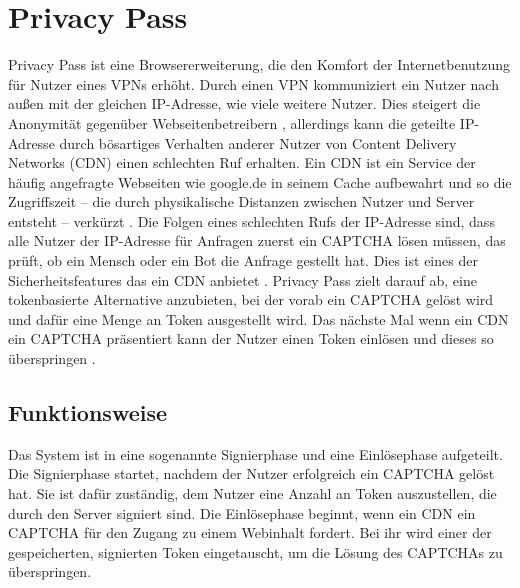 \documentclass[
	fontsize=11pt,
	headings=small,
	parskip=half,           %
	bibliography=totoc,
	numbers=noenddot,       %
	open=any,               %
]{scrreprt}
\begin{document}
\section{Privacy Pass}
\label{sec:privacy-pass}
Privacy Pass ist eine Browsererweiterung, die den Komfort der Internetbenutzung für Nutzer eines VPNs erhöht. Durch einen VPN kommuniziert ein Nutzer nach außen mit der gleichen IP-Adresse, wie viele weitere Nutzer. Dies steigert die Anonymität gegenüber Webseitenbetreibern \cite{pp-Abbas2023Security}, allerdings kann die geteilte IP-Adresse durch bösartiges Verhalten anderer Nutzer von Content Delivery Networks (CDN) einen schlechten Ruf erhalten. Ein CDN ist ein Service der häufig angefragte Webseiten wie google.de in seinem Cache aufbewahrt und so die Zugriffszeit -- die durch physikalische Distanzen zwischen Nutzer und Server entsteht -- verkürzt \cite{pp-cdn}. Die Folgen eines schlechten Rufs der IP-Adresse sind, dass alle Nutzer der IP-Adresse für Anfragen zuerst ein CAPTCHA lösen müssen, das prüft, ob ein Mensch oder ein Bot die Anfrage gestellt hat. Dies ist eines der Sicherheitsfeatures das ein CDN anbietet \cite{pp-Ghaznavi2021Content}. Privacy Pass zielt darauf ab, eine tokenbasierte Alternative anzubieten, bei der vorab ein CAPTCHA gelöst wird und dafür eine Menge an Token ausgestellt wird. Das nächste Mal wenn ein CDN ein CAPTCHA präsentiert kann der Nutzer einen Token einlösen und dieses so überspringen \cite{pp-davidson2018privacy}.

\subsection{Funktionsweise}
Das System ist in eine sogenannte Signierphase und eine Einlösephase aufgeteilt. Die Signierphase startet, nachdem der Nutzer erfolgreich ein CAPTCHA gelöst hat. Sie ist dafür zuständig, dem Nutzer eine Anzahl an Token auszustellen, die durch den Server signiert sind. Die Einlösephase beginnt, wenn ein CDN ein CAPTCHA für den Zugang zu einem Webinhalt fordert. Bei ihr wird einer der gespeicherten, signierten Token eingetauscht, um die Lösung des CAPTCHAs zu überspringen. 
\end{document}
